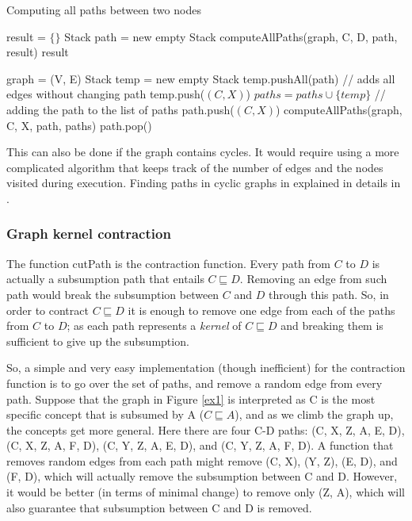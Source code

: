 \begin{algorithm}
\caption{Computing all paths between two nodes}
\label{GetPaths}
\begin{algorithmic}[1]
\State result = $\{\}$
\State Stack path = new empty Stack
\State computeAllPaths(graph, C, D, path, result)
\State \Return result
\EndFunction
\end{algorithmic}

\begin{algorithmic}[1]
\State graph = (V, E)
\State Stack temp = new empty Stack
\State temp.pushAll(path)  // adds all edges without changing path
\State temp.push($(C, X)$)
\State $paths = paths \cup \{temp\}$  // adding the path to the list of paths
\Else
\State path.push($(C, X)$)
\State computeAllPaths(graph, C, X, path, paths)
\State path.pop()
\EndIf
\EndFor
\EndFunction
\end{algorithmic}
\end{algorithm}

This can also be done if the graph contains cycles. It would require using a more complicated algorithm that keeps track of the number of edges and the nodes visited during execution. Finding paths in cyclic graphs in explained in details in \cite{alg}.

\subsubsection{Graph kernel contraction}
The function cutPath is the contraction function. Every path from $C$ to $D$ is actually a subsumption path that entails $C \sqsubseteq D$. Removing an edge from such path would break the subsumption between $C$ and $D$ through this path. So, in order to contract $C \sqsubseteq D$ it is enough to remove one edge from each of the paths from $C$ to $D$; as each path represents a \textit{kernel} of $C \sqsubseteq D$ and breaking them is sufficient to give up the subsumption. 

So, a simple and very easy implementation (though inefficient) for the contraction function is to go over the set of paths, and remove a random edge from every path. Suppose that the graph in Figure \ref{ex1} is interpreted as C is the most specific concept that is subsumed by A ($C \sqsubseteq A$), and as we climb the graph up, the concepts get more general. Here there are four C-D paths: (C, X, Z, A, E, D), (C, X, Z, A, F, D), (C, Y, Z, A, E, D), and (C, Y, Z, A, F, D). A function that removes random edges from each path might remove (C, X), (Y, Z), (E, D), and (F, D), which will actually remove the subsumption between C and D. However, it would be better (in terms of minimal change) to remove only (Z, A), which will also guarantee that subsumption between C and D is removed.

